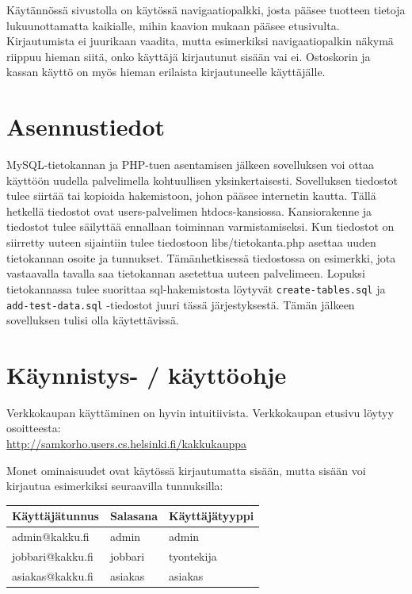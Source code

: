 \documentclass[a4paper,12pt, titlepage]{article}
\begin{document}
\noindent
Käytännössä sivustolla on käytössä navigaatiopalkki, josta pääsee tuotteen tietoja lukuunottamatta kaikialle, mihin kaavion mukaan pääsee etusivulta. Kirjautumista ei juurikaan vaadita, mutta esimerkiksi navigaatiopalkin näkymä riippuu hieman siitä, onko käyttäjä kirjautunut sisään vai ei. Ostoskorin ja kassan käyttö on myös hieman erilaista kirjautuneelle käyttäjälle.

\section{Asennustiedot}
MySQL-tietokannan ja PHP-tuen asentamisen jälkeen sovelluksen voi ottaa käyttöön uudella palvelimella kohtuullisen yksinkertaisesti. Sovelluksen tiedostot tulee siirtää tai kopioida hakemistoon, johon pääsee internetin kautta. Tällä hetkellä tiedostot ovat users-palvelimen htdocs-kansiossa. Kansiorakenne ja tiedostot tulee säilyttää ennallaan toiminnan varmistamiseksi. Kun tiedostot on siirretty uuteen sijaintiin tulee tiedostoon libs/tietokanta.php asettaa uuden tietokannan osoite ja tunnukset. Tämänhetkisessä tiedostossa on esimerkki, jota vastaavalla tavalla saa tietokannan asetettua uuteen palvelimeen. Lopuksi tietokannassa tulee suorittaa sql-hakemistosta löytyvät \verb|create-tables.sql| ja \verb|add-test-data.sql| -tiedostot juuri tässä järjestyksestä. Tämän jälkeen sovelluksen tulisi olla käytettävissä.

\section{Käynnistys- / käyttöohje}
Verkkokaupan käyttäminen on hyvin intuitiivista. Verkkokaupan etusivu löytyy osoitteesta: \\
\url{http://samkorho.users.cs.helsinki.fi/kakkukauppa} \\
\hfill

\noindent
Monet ominaisuudet ovat käytössä kirjautumatta sisään, mutta sisään voi kirjautua esimerkiksi seuraavilla tunnuksilla: 

\begin{table}[H]
\begin{tabularx}{\textwidth}{|X|X|X|}
\hline
\bf{Käyttäjätunnus} & \textbf{Salasana}	& \textbf{Käyttäjätyyppi}  \\ \hline
admin@kakku.fi   & admin & admin \\ \hline
jobbari@kakku.fi   & jobbari & tyontekija \\ \hline
asiakas@kakku.fi   & asiakas & asiakas \\ \hline

\end{tabularx}
\end{table}
\end{document}

